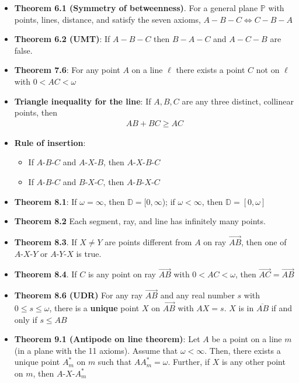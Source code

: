 \documentclass{report}
\begin{document}
    \pagebreak 
    \begin{itemize}
        \item \textbf{Theorem 6.1 (Symmetry of betweenness)}. For a general plane $\mathbb{P}$ with points, lines, distance, and satisfy the seven axioms, $A-B-C \iff C-B-A$
        \item \textbf{Theorem 6.2 (UMT)}: If $A-B-C$ then $B-A-C$ and $A-C-B$ are false.
        \item \textbf{Theorem 7.6}: For any point $A$ on a line $\ell$ there exists a point $C$ not on $\ell$ with $0 < AC <\omega$ 
    \item \textbf{Triangle inequality for the line}: If $A,B,C$ are any three distinct, collinear points, then 
        \begin{align*}
            AB + BC \geq AC 
        \end{align*}
    \item \textbf{Rule of insertion}: 
        \begin{itemize}
            \item If $ A\text{-}B\text{-}C$ and $ A\text{-}X\text{-}B$, then $ A\text{-}X\text{-}B\text{-}C $
            \item If $ A\text{-}B\text{-}C$ and $ B\text{-}X\text{-}C$, then $ A\text{-}B\text{-}X\text{-}C $
        \end{itemize}
        \item \textbf{Theorem 8.1}: If $\omega = \infty$, then $\mathbb{D} = [0,\infty$); if $\omega < \infty$, then $\mathbb{D} = [0,\omega] $
        \item \textbf{Theorem 8.2} Each segment, ray, and line has infinitely many points.
        \item \textbf{Theorem 8.3}. If $X \ne Y$ are points different from $A$ on ray $\overrightarrow{AB}$, then one of $ A\text{-}X\text{-}Y$ or $ A\text{-}Y\text{-}X$ is true.
        \item \textbf{Theorem 8.4}. If $C$ is any point on ray $ \overrightarrow{AB}$ with $ 0 < AC < \omega$, then $ \overrightarrow{AC} = \overrightarrow{AB} $
        \item \textbf{Theorem 8.6 (UDR)} For any ray $ \overrightarrow{AB}$ and any real number $s$ with $0 \leq s \leq \omega$, there is a \textbf{unique} point $X$ on $\overrightarrow{AB}$ with $AX = s$. $X$ is in $\overline{AB}$ if and only if $s \leq   AB $
        \item \textbf{Theorem 9.1 (Antipode on line theorem)}: Let $A$ be a point on a line $m$ (in a plane with the 11 axioms). Assume that $\omega < \infty$. Then, there exists a unique point $A^{*}_{m}$ on $m$ such that $AA_{m}^{*} = \omega$. Further, if $X$ is any other point on $m$, then $ A\text{-}X\text{-}A^{*}_{m} $

\end{itemize}
\end{document}
